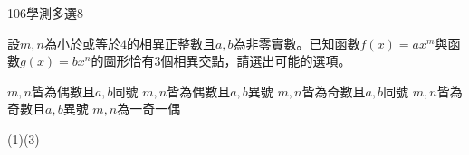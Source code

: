 \begin{QUESTIONS}
    \begin{QUESTION}
        \begin{ExamInfo}{106}{學測}{多選}{8}
        \end{ExamInfo}
        \begin{ExamAnsRateInfo}{24}{35}{20}{17}
        \end{ExamAnsRateInfo}
        \begin{QBODY}
            設$m,n$為小於或等於$4$的相異正整數且$a,b$為非零實數。已知函數$f(x)=a{{x}^{m}}$與函數$g(x)=b{{x}^{n}}$的圖形恰有$3$個相異交點，請選出可能的選項。
			\begin{QOPS}
			\QOP $m,n$皆為偶數且$a,b$同號 
			\QOP $m,n$皆為偶數且$a,b$異號
			\QOP $m,n$皆為奇數且$a,b$同號
			\QOP $m,n$皆為奇數且$a,b$異號
			\QOP $m,n$為一奇一偶
			\end{QOPS}
        \end{QBODY}
        \begin{QFROMS}
        \end{QFROMS}
        \begin{QTAGS}\end{QTAGS}
        \begin{QANS}
            (1)(3)
        \end{QANS}
        \begin{QSOLLIST}
            \begin{QSOL}[SOLID=29]
            \end{QSOL}
\begin{QSOL}[SOLID=30]
                \begin{QSTEPS}
                \end{QSTEPS}
            \end{QSOL}


\end{QSOLLIST}
\end{QUESTION}
\end{QUESTIONS}
